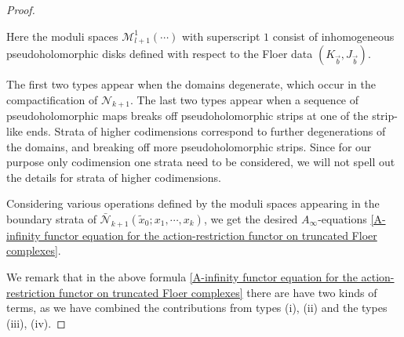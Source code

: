 \documentclass{amsart}
\numberwithin{equation}{section}
\numberwithin{figure}{section}
\begin{document}
\begin{proof}
\begin{enumerate}[label=(\roman*)]
\end{enumerate}
	Here the moduli spaces $\mathcal{M}_{l+1}^{1}(\cdots)$ with superscript $1$ consist of inhomogeneous pseudoholomorphic disks defined with respect to the Floer data $(K_{\vec{b}}, J_{\vec{b}})$. \par
	The first two types appear when the domains degenerate, which occur in the compactification of $\mathcal{N}_{k+1}$. The last two types appear when a sequence of pseudoholomorphic maps breaks off pseudoholomorphic strips at one of the strip-like ends. Strata of higher codimensions correspond to further degenerations of the domains, and breaking off more pseudoholomorphic strips. Since for our purpose only codimension one strata need to be considered, we will not spell out the details for strata of higher codimensions. \par
	Considering various operations defined by the moduli spaces appearing in the boundary strata of $\bar{\mathcal{N}}_{k+1}(\tilde{x}_{0}; x_{1}, \cdots, x_{k})$, we get the desired $A_{\infty}$-equations \eqref{A-infinity functor equation for the action-restriction functor on truncated Floer complexes}. \par
	We remark that in the above formula \eqref{A-infinity functor equation for the action-restriction functor on truncated Floer complexes} there are have two kinds of terms, as we have combined the contributions from types (i), (ii) and the types (iii), (iv). \par
\end{proof}
\end{document}
